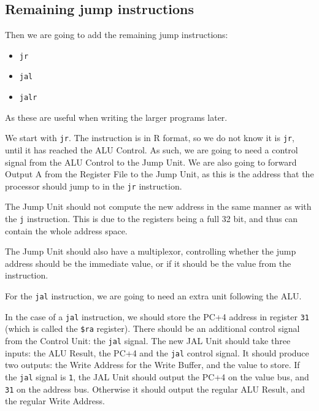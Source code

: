 \documentclass{beamer}
\begin{document}
\subsection{Remaining jump instructions}
\begin{frame}
    Then we are going to add the remaining jump instructions:
    \begin{itemize}
        \item \texttt{jr}
        \item \texttt{jal}
        \item \texttt{jalr}
    \end{itemize}
    As these are useful when writing the larger programs later.
\end{frame}
\begin{frame}
    We start with \texttt{jr}. The instruction is in R format, so we do not
    know it is \texttt{jr}, until it has reached the ALU Control. As such, we
    are going to need a control signal from the ALU Control to the Jump Unit.
    We are also going to forward Output A from the Register File to the Jump
    Unit, as this is the address that the processor should jump to in the
    \texttt{jr} instruction.

    \vspace{\baselineskip}
    The Jump Unit should not compute the new address in the same manner as with
    the \texttt{j} instruction. This is due to the registers being a full 32
    bit, and thus can contain the whole address space.

    \vspace{\baselineskip}
    The Jump Unit should also have a multiplexor, controlling whether the jump
    address should be the immediate value, or if it should be the value from
    the instruction.
\end{frame}
\begin{frame}
    For the \texttt{jal} instruction, we are going to need an extra unit
    following the ALU.

    \vspace{\baselineskip}
    In the case of a \texttt{jal} instruction, we should store the PC+4 address
    in register \texttt{31} (which is called the \texttt{\$ra} register).
    There should be an additional control signal from the Control Unit: the
    \texttt{jal} signal. The new JAL Unit should take three inputs: the ALU
    Result, the PC+4 and the \texttt{jal} control signal. It should produce two
    outputs: the Write Address for the Write Buffer, and the value to store. If
    the \texttt{jal} signal is \texttt{1}, the JAL Unit should output the PC+4
    on the value bus, and \texttt{31} on the address bus.  Otherwise it should
    output the regular ALU Result, and the regular Write Address.
\end{frame}
\end{document}
